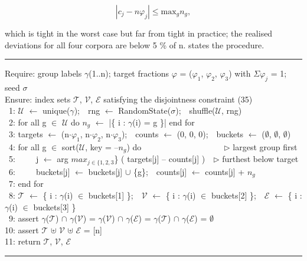 \begin{equation}
\label{eq:37}
| c_j - n \varphi _j | \leq \mathrm{max}_g n_g ,
\end{equation}

which is tight in the worst case but far from tight in practice; the realised deviations for all four corpora are below 5 \% of n.  states the procedure.

\begin{algorithm}[htbp]
\caption{Group-disjoint partitioning (greedy longest-first deal)}
\label{alg:1}
\hrule\vspace{3pt}
{\ttfamily\scriptsize\raggedright
Require: group labels $\gamma$(1..n); target fractions $\varphi$ = ($\varphi_{1}$, $\varphi_{2}$, $\varphi_{3}$) with $\Sigma \varphi_{j}$ = 1; seed $\sigma$ \\
Ensure: index sets $\mathcal{T}$, $\mathcal{V}$, $\mathcal{E}$ satisfying the disjointness constraint (35) \\
~1: $\mathcal{U}$ $\leftarrow$ unique($\gamma$);~~rng $\leftarrow$ RandomState($\sigma$);~~shuffle($\mathcal{U}$, rng) \\
~2: for all g $\in$ $\mathcal{U}$ do $n_{g}$ $\leftarrow$ |\{ i : $\gamma$(i) = g \}| end for \\
~3: targets $\leftarrow$ (n$\cdot\varphi_{1}$, n$\cdot\varphi_{2}$, n$\cdot\varphi_{3}$);~~counts $\leftarrow$ (0, 0, 0);~~buckets $\leftarrow$ ($\emptyset$, $\emptyset$, $\emptyset$) \\
~4: for all g $\in$ sort($\mathcal{U}$, key = --$n_{g}$) do~~~~~~~~~~~~~~~~~~~~$\triangleright$ largest group first \\
~5:~~~~~j $\leftarrow$ arg $max_{j \in \{1,2,3}$\} ( targets[j] -- counts[j] )~~$\triangleright$ furthest below target \\
~6:~~~~~buckets[j] $\leftarrow$ buckets[j] $\cup$ \{g\};~~counts[j] $\leftarrow$ counts[j] + $n_{g}$ \\
~7: end for \\
~8: $\mathcal{T}$ $\leftarrow$ \{ i : $\gamma$(i) $\in$ buckets[1] \};~~$\mathcal{V}$ $\leftarrow$ \{ i : $\gamma$(i) $\in$ buckets[2] \};~~$\mathcal{E}$ $\leftarrow$ \{ i : $\gamma$(i) $\in$ buckets[3] \} \\
~9: assert $\gamma$($\mathcal{T}$) $\cap$ $\gamma$($\mathcal{V}$) = $\gamma$($\mathcal{V}$) $\cap$ $\gamma$($\mathcal{E}$) = $\gamma$($\mathcal{T}$) $\cap$ $\gamma$($\mathcal{E}$) = $\emptyset$ \\
10: assert $\mathcal{T}$ $\uplus$ $\mathcal{V}$ $\uplus$ $\mathcal{E}$ = [n] \\
11: return $\mathcal{T}$, $\mathcal{V}$, $\mathcal{E}$
\par}
\vspace{3pt}\hrule
\end{algorithm}

